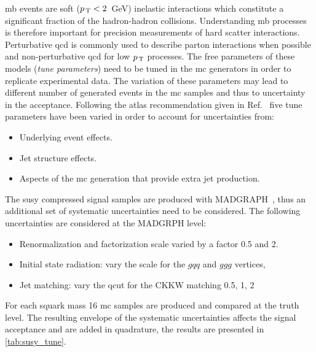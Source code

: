 \gls{mb} events are soft ($p_\mathrm{\, T} < 2$~GeV) inelastic interactions which constitute
a significant fraction of the hadron-hadron collisions. Understanding \gls{mb}
processes is therefore important for precision measurements of hard scatter
interactions. Perturbative \gls{qcd} is commonly used to describe parton
interactions when possible and non-perturbative \gls{qcd} for low $p_\mathrm{\, T}$
processes. The free parameters of these models (\emph{tune parameters}) need to
be tuned in the \gls{mc} generators in order to replicate experimental data. The
variation of these parameters may lead to different number of generated events
in the \gls{mc} samples and thus to uncertainty in the acceptance. Following the
\gls{atlas} recommendation given in Ref.~\cite{MCTuningRecommendations2015} five
tune parameters have been varied in order to account for uncertainties from:
\begin{itemize}
\item Underlying event effects.
\item Jet structure effects.
\item Aspects of the \gls{mc} generation that provide extra jet production.
\end{itemize}
The \gls{susy} compressed signal samples are produced with
MADGRAPH~\cite{MADGRAPH}, thus an additional set of systematic uncertainties
need to be considered. The following uncertainties are considered at the MADGRPH
level:
\begin{itemize}
\item Renormalization and factorization scale varied by a factor 0.5 and 2.
\item Initial state radiation: vary the scale for the $gqq$ and $ggg$ vertices,
\item Jet matching: vary the qcut for the CKKW matching 0.5, 1, 2
\end{itemize}
For each squark mass 16 \gls{mc} samples are produced and compared at the truth
level. The resulting envelope of the systematic uncertainties affects the signal
acceptance and are added in quadrature, the results are presented in
\cref{tab:susy_tune}.
\begin{table}[!h]
  \centering
  \caption{Total theoretical uncertainty in \% on the \gls{susy} compressed
    spectra signal region acceptance as function of the $\met$ bin in the signal
    region, from tune, initial and final state radiation systematic
    uncertainties. The final value is a common envelope valid for all the
    \gls{susy} compressed models.}
  \label{tab:susy_tune}
\end{table}
